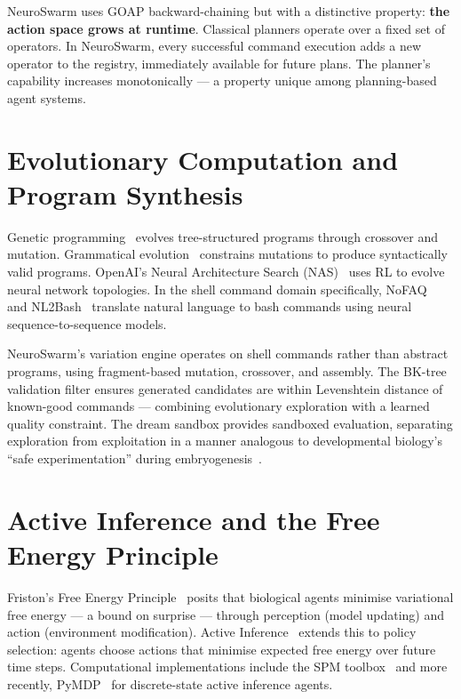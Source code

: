 \documentclass[12pt,a4paper]{report}
\begin{document}
NeuroSwarm uses GOAP backward-chaining but with a distinctive property: \textbf{the action space grows at runtime}. Classical planners operate over a fixed set of operators. In NeuroSwarm, every successful command execution adds a new operator to the registry, immediately available for future plans. The planner's capability increases monotonically --- a property unique among planning-based agent systems.

\section{Evolutionary Computation and Program Synthesis}

Genetic programming~\cite{koza1992genetic} evolves tree-structured programs through crossover and mutation. Grammatical evolution~\cite{oneill2001grammatical} constrains mutations to produce syntactically valid programs. OpenAI's Neural Architecture Search (NAS)~\cite{zoph2017neural} uses RL to evolve neural network topologies. In the shell command domain specifically, NoFAQ~\cite{lin2018nl2bash} and NL2Bash~\cite{lin2018nl2bash} translate natural language to bash commands using neural sequence-to-sequence models.

NeuroSwarm's variation engine operates on shell commands rather than abstract programs, using fragment-based mutation, crossover, and assembly. The BK-tree validation filter ensures generated candidates are within Levenshtein distance of known-good commands --- combining evolutionary exploration with a learned quality constraint. The dream sandbox provides sandboxed evaluation, separating exploration from exploitation in a manner analogous to developmental biology's ``safe experimentation'' during embryogenesis~\cite{revonsuo2000reinterpretation}.

\section{Active Inference and the Free Energy Principle}

Friston's Free Energy Principle~\cite{friston2010free} posits that biological agents minimise variational free energy --- a bound on surprise --- through perception (model updating) and action (environment modification). Active Inference~\cite{friston2017active} extends this to policy selection: agents choose actions that minimise expected free energy over future time steps. Computational implementations include the SPM toolbox~\cite{friston2007spm} and more recently, PyMDP~\cite{heins2022pymdp} for discrete-state active inference agents.
\end{document}
